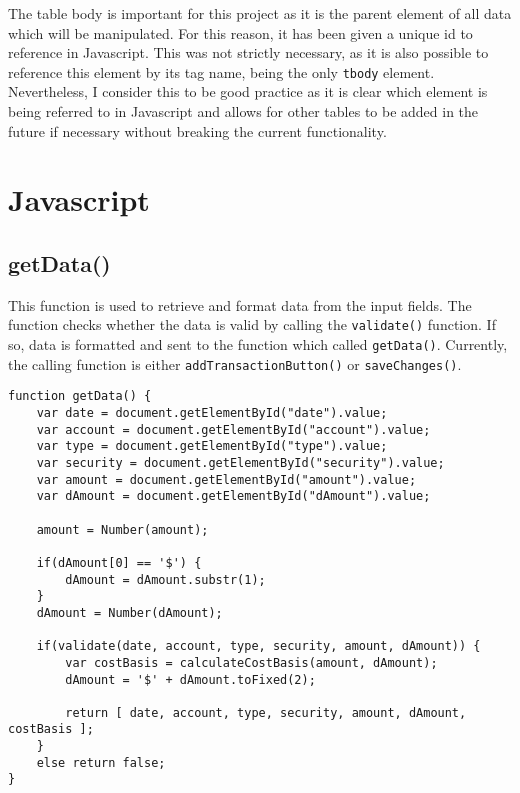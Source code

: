 \documentclass[letterpaper]{article}
\begin{document}
The table body is important for this project as it is the parent element of all data which will be manipulated.
For this reason, it has been given a unique id to reference in Javascript.
This was not strictly necessary, as it is also possible to reference this element by its tag name, being the only \lstinline{tbody} element.
Nevertheless, I consider this to be good practice as it is clear which element is being referred to in Javascript and allows for other tables to be added in the future if necessary without breaking the current functionality.

\newpage

\section{Javascript}\label{JS}

\subsection{getData()}

This function is used to retrieve and format data from the input fields.
The function checks whether the data is valid by calling the \lstinline{validate()} function.
If so, data is formatted and sent to the function which called \lstinline{getData()}.
Currently, the calling function is either \lstinline{addTransactionButton()} or \lstinline{saveChanges()}.

\begin{lstlisting}[firstnumber=1]
function getData() {
    var date = document.getElementById("date").value;
    var account = document.getElementById("account").value;
    var type = document.getElementById("type").value;
    var security = document.getElementById("security").value;
    var amount = document.getElementById("amount").value;
    var dAmount = document.getElementById("dAmount").value;

    amount = Number(amount);

    if(dAmount[0] == '$') {
        dAmount = dAmount.substr(1);
    }
    dAmount = Number(dAmount);

    if(validate(date, account, type, security, amount, dAmount)) {
        var costBasis = calculateCostBasis(amount, dAmount);
        dAmount = '$' + dAmount.toFixed(2);

        return [ date, account, type, security, amount, dAmount, costBasis ];
    }
    else return false;
}
\end{lstlisting}
\end{document}
